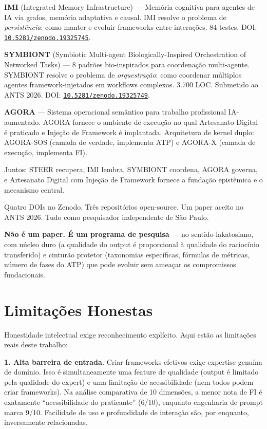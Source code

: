 \documentclass[12pt,a4paper]{article}
\begin{document}
\textbf{IMI} (Integrated Memory Infrastructure) --- Memória cognitiva para agentes de IA via grafos, memória adaptativa e causal. IMI resolve o problema de \emph{persistência}: como manter e evoluir frameworks entre interações. 84 testes. DOI: \href{https://doi.org/10.5281/zenodo.19325745}{\texttt{10.5281/zenodo.19325745}}.

\textbf{SYMBIONT} (Symbiotic Multi-agent Biologically-Inspired Orchestration of Networked Tasks) --- 8 padrões bio-inspirados para coordenação multi-agente. SYMBIONT resolve o problema de \emph{orquestração}: como coordenar múltiplos agentes framework-injetados em workflows complexos. 3.700 LOC. Submetido ao ANTS 2026. DOI: \href{https://doi.org/10.5281/zenodo.19325749}{\texttt{10.5281/zenodo.19325749}}.

\textbf{AGORA} --- Sistema operacional semântico para trabalho profissional IA-aumentado. AGORA fornece o ambiente de execução no qual Artesanato Digital é praticado e Injeção de Framework é implantada. Arquitetura de kernel duplo: AGORA-SOS (camada de verdade, implementa ATP) e AGORA-X (camada de execução, implementa FI).

Juntos: STEER recupera, IMI lembra, SYMBIONT coordena, AGORA governa, e Artesanato Digital com Injeção de Framework fornece a fundação epistêmica e o mecanismo central.

Quatro DOIs no Zenodo. Três repositórios open-source. Um paper aceito no ANTS 2026. Tudo como pesquisador independente de São Paulo.

\textbf{Não é um paper. É um programa de pesquisa} --- no sentido lakatosiano, com núcleo duro (a qualidade do output é proporcional à qualidade do raciocínio transferido) e cinturão protetor (taxonomias específicas, fórmulas de métricas, número de fases do ATP) que pode evoluir sem ameaçar os compromissos fundacionais.

\section{Limitações Honestas}
\label{sec:limitacoes}

Honestidade intelectual exige reconhecimento explícito. Aqui estão as limitações reais deste trabalho:

\textbf{1. Alta barreira de entrada.} Criar frameworks efetivos exige expertise genuína de domínio. Isso é simultaneamente uma feature de qualidade (output é limitado pela qualidade do expert) e uma limitação de acessibilidade (nem todos podem criar frameworks). Na análise comparativa de 10 dimensões, a menor nota de FI é exatamente ``acessibilidade do praticante'' (6/10), enquanto engenharia de prompt marca 9/10. Facilidade de uso e profundidade de interação são, por enquanto, inversamente relacionadas.
\end{document}

